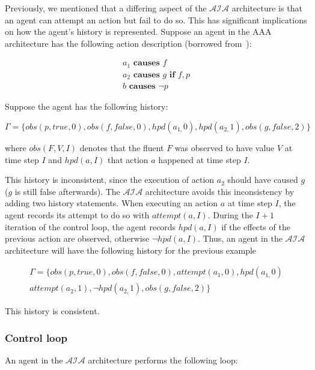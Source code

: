 Previously, we mentioned that a differing aspect of the $\mathcal{AIA}$ architecture is that an agent can attempt an action but fail to do so.
This has significant implications on how the agent's history is represented.
Suppose an agent in the AAA architecture has the following action description (borrowed from~\citep{blount_towards_2014}):

\begin{gather*}
    a_1 \textbf{ causes } f \\
    a_2 \textbf{ causes } g \textbf{ if } f, p \\
    b \textbf{ causes } \neg p
\end{gather*}

Suppose the agent has the following history:

\[
\Gamma=\{obs\left(p,true,0\right),obs\left(f,false,0\right),hpd\left(a_{1,}0\right),hpd\left(a_{2,}1\right),obs\left(g,false,2\right)\}
\]

\noindent
where $obs(F, V, I)$ denotes that the fluent $F$ was observed to have value $V$ at time step $I$ and $hpd(a, I)$ that action $a$ happened at time step $I$.

This history is inconsistent, since the execution of action $a_2$ should have caused $g$ ($g$ is still false afterwards).
The $\mathcal{AIA}$ architecture avoids this inconsistency by adding two history statements.
When executing an action $a$ at time step $I$, the agent records its attempt to do so with $attempt(a, I)$.
During the $I+1$ iteration of the control loop, the agent records $hpd(a, I)$ if the effects of the previous action are observed, otherwise $\neg hpd(a, I)$.
Thus, an agent in the $\mathcal{AIA}$ architecture will have the following history for the previous example

\begin{multline*}
    \Gamma=\{
        obs\left(p,true,0\right),obs\left(f,false,0\right),attempt(a_1, 0),hpd\left(a_{1,}0\right) \\
        attempt(a_2, 1), \neg hpd\left(a_{2,}1\right),obs\left(g,false,2\right)
    \}
\end{multline*}

This history is consistent.

\subsubsection{Control loop}
\label{subsubsec:control_loop}

An agent in the $\mathcal{AIA}$ architecture performs the following loop:

